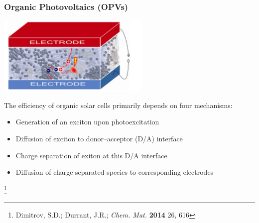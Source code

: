 \documentclass[usepdftitle=false,10pt]{beamer}
\newcommand\blfootnote[1]{%
  \begingroup
  \renewcommand\thefootnote{}\footnote{#1}%
  \addtocounter{footnote}{-1}%
  \endgroup
}
\begin{document}
%
\begin{frame}
  \frametitle{\textbf{O}rganic \textbf{P}hoto\textbf{v}oltaics (OPVs)}
  \begin{center}
    \includegraphics[width=0.55\textwidth]{OPV}
  \end{center}
  The efficiency of organic solar cells primarily depends on four
  mechanisms:
  \begin{itemize}
    \item[\ding{228}] Generation of an exciton upon photoexcitation
    \item[\ding{228}] Diffusion of exciton to donor--acceptor (D/A) interface
    \item[\ding{228}] Charge separation of exiton at this D/A interface
    \item[\ding{228}] Diffusion of charge separated species to corresponding electrodes
  \end{itemize}
  \blfootnote{\tiny Dimitrov, S.D.; Durrant, J.R.; \emph{Chem. Mat.} \textbf{2014} 26, 616}
\end{frame}
\end{document}
